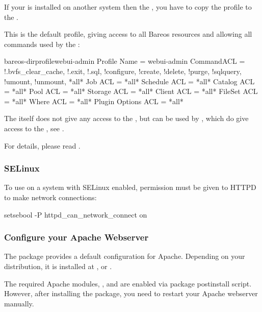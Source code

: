 If your \bareosWebui is installed on another system then the \bareosDir, you have to copy the profile to the \bareosDir.

This is the default profile, giving access to all Bareos resources and allowing all commands used by the \bareosWebui:

\begin{bareosConfigResource}{bareos-dir}{profile}{webui-admin}
Profile {
  Name = webui-admin
  CommandACL = !.bvfs_clear_cache, !.exit, !.sql, !configure, !create, !delete, !purge, !sqlquery, !umount, !unmount, *all*
  Job ACL = *all*
  Schedule ACL = *all*
  Catalog ACL = *all*
  Pool ACL = *all*
  Storage ACL = *all*
  Client ACL = *all*
  FileSet ACL = *all*
  Where ACL = *all*
  Plugin Options ACL = *all*
}
\end{bareosConfigResource}

The  itself does not give any access to the \bareosDir,
but can be used by , which do give access to the \bareosDir, see .

For details, please read .

\subsubsection{SELinux}
\label{sec:webui-selinux}

To use \bareosDir on a system with SELinux enabled,
permission must be given to HTTPD to make network connections:
\begin{commands}{}
setsebool -P httpd_can_network_connect on
\end{commands}


\subsubsection{Configure your Apache Webserver}
\label{sec:webui-apache}

The package  provides a default configuration for Apache.
Depending on your distribution, it is installed at ,  or .

The required Apache modules, ,  and  are enabled via package postinstall script.
However, after installing the  package, you need to restart your Apache webserver manually.

